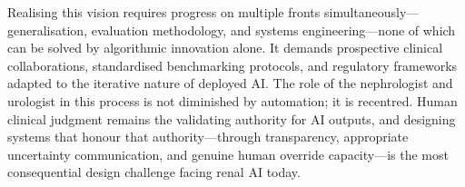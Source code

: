 Realising this vision requires progress on multiple fronts simultaneously---generalisation, evaluation methodology, and systems engineering---none of which can be solved by algorithmic innovation alone. It demands prospective clinical collaborations, standardised benchmarking protocols, and regulatory frameworks adapted to the iterative nature of deployed AI. The role of the nephrologist and urologist in this process is not diminished by automation; it is recentred. Human clinical judgment remains the validating authority for AI outputs, and designing systems that honour that authority---through transparency, appropriate uncertainty communication, and genuine human override capacity---is the most consequential design challenge facing renal AI today.